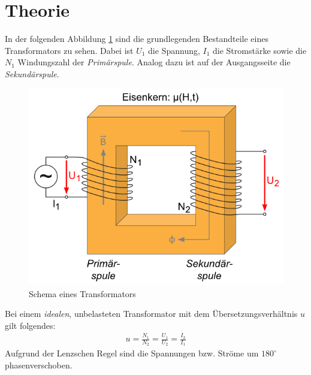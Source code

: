 \documentclass[12pt,a4paper,titlepage,headinclude,bibtotoc]{scrartcl}
\begin{document}
\section{Theorie}
\label{sec:theorie}
In der folgenden Abbildung \ref{fig:TrafoSchema} sind die grundlegenden Bestandteile eines Transformators zu sehen.
Dabei ist $U_1$ die Spannung, $I_1$ die Stromstärke sowie die $N_1$ Windungszahl der \textit{Primärspule}.
Analog dazu ist auf der Ausgangsseite die \textit{Sekundärspule}.

\begin{figure}[!htb]
	\centering
	\includegraphics[scale=1.0]{TrafoSchema.png}
	\caption{Schema eines Transformators \protect\footnotemark}
	\label{fig:TrafoSchema}
\end{figure}

Bei einem \textit{idealen}, unbelasteten Transformator mit dem Übersetzungsverhältnis $u$ gilt folgendes:
\begin{align}
	u=\frac{N_1}{N_2}=\frac{U_1}{U_2}=\frac{I_2}{I_1}
	\label{eq:u}  
\end{align}
Aufgrund der Lenzschen Regel sind die Spannungen bzw. Ströme um $180^\circ$ phasenverschoben.
\end{document}

